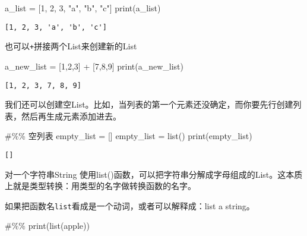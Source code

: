 \documentclass[
  letterpaper,
  DIV=11,
  numbers=noendperiod]{scrreprt}
\newenvironment{Shaded}{\begin{snugshade}}{\end{snugshade}}
\newcommand{\BuiltInTok}[1]{\textcolor[rgb]{0.00,0.23,0.31}{#1}}
\newcommand{\CommentTok}[1]{\textcolor[rgb]{0.37,0.37,0.37}{#1}}
\newcommand{\DecValTok}[1]{\textcolor[rgb]{0.68,0.00,0.00}{#1}}
\newcommand{\NormalTok}[1]{\textcolor[rgb]{0.00,0.23,0.31}{#1}}
\newcommand{\OperatorTok}[1]{\textcolor[rgb]{0.37,0.37,0.37}{#1}}
\newcommand{\StringTok}[1]{\textcolor[rgb]{0.13,0.47,0.30}{#1}}
\begin{document}
\begin{Shaded}
\begin{Highlighting}[]
\NormalTok{a\_list }\OperatorTok{=}\NormalTok{ [}\DecValTok{1}\NormalTok{, }\DecValTok{2}\NormalTok{, }\DecValTok{3}\NormalTok{, }\StringTok{"a"}\NormalTok{, }\StringTok{"b"}\NormalTok{, }\StringTok{"c"}\NormalTok{]}
\BuiltInTok{print}\NormalTok{(a\_list)}
\end{Highlighting}
\end{Shaded}

\begin{verbatim}
[1, 2, 3, 'a', 'b', 'c']
\end{verbatim}

也可以\texttt{+}拼接两个List来创建新的List

\begin{Shaded}
\begin{Highlighting}[]
\NormalTok{a\_new\_list }\OperatorTok{=}\NormalTok{ [}\DecValTok{1}\NormalTok{,}\DecValTok{2}\NormalTok{,}\DecValTok{3}\NormalTok{] }\OperatorTok{+}\NormalTok{ [}\DecValTok{7}\NormalTok{,}\DecValTok{8}\NormalTok{,}\DecValTok{9}\NormalTok{]}
\BuiltInTok{print}\NormalTok{(a\_new\_list)}
\end{Highlighting}
\end{Shaded}

\begin{verbatim}
[1, 2, 3, 7, 8, 9]
\end{verbatim}

我们还可以创建空List。比如，当列表的第一个元素还没确定，而你要先行创建列表，然后再生成元素添加进去。

\begin{Shaded}
\begin{Highlighting}[]
\CommentTok{\#\%\% 空列表}
\NormalTok{empty\_list }\OperatorTok{=}\NormalTok{ []}
\NormalTok{empty\_list }\OperatorTok{=} \BuiltInTok{list}\NormalTok{()}
\BuiltInTok{print}\NormalTok{(empty\_list)}
\end{Highlighting}
\end{Shaded}

\begin{verbatim}
[]
\end{verbatim}

对一个字符串String
使用list()函数，可以把字符串分解成字母组成的List。这本质上就是类型转换：用类型的名字做转换函数的名字。

如果把函数名\texttt{list}看成是一个动词，或者可以解释成：list a string。

\begin{Shaded}
\begin{Highlighting}[]
\CommentTok{\#\%\% }
\BuiltInTok{print}\NormalTok{(}\BuiltInTok{list}\NormalTok{(}\StringTok{\textquotesingle{}apple\textquotesingle{}}\NormalTok{))}
\end{Highlighting}
\end{Shaded}
\end{document}
